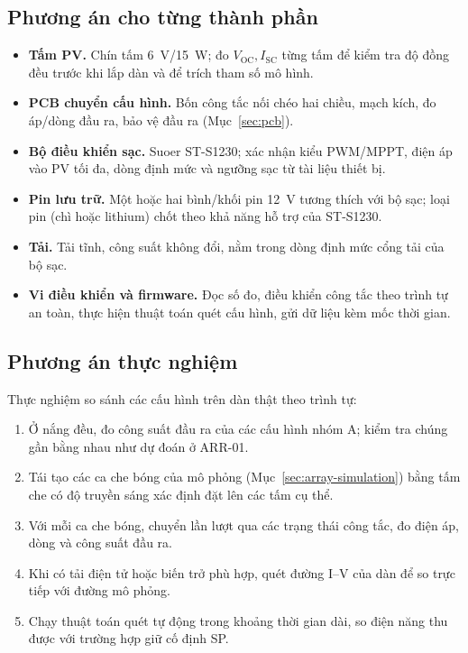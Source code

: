 \subsection{Phương án cho từng thành phần}

\begin{itemize}
    \item \textbf{Tấm PV.} Chín tấm 6~V/15~W; đo \(V_{\mathrm{OC}}, I_{\mathrm{SC}}\) từng tấm để kiểm tra độ đồng đều trước khi lắp dàn và để trích tham số mô hình.
    \item \textbf{PCB chuyển cấu hình.} Bốn công tắc nối chéo hai chiều, mạch kích, đo áp/dòng đầu ra, bảo vệ đầu ra (Mục~\ref{sec:pcb}).
    \item \textbf{Bộ điều khiển sạc.} Suoer ST-S1230; xác nhận kiểu PWM/MPPT, điện áp vào PV tối đa, dòng định mức và ngưỡng sạc từ tài liệu thiết bị.
    \item \textbf{Pin lưu trữ.} Một hoặc hai bình/khối pin 12~V tương thích với bộ sạc; loại pin (chì hoặc lithium) chốt theo khả năng hỗ trợ của ST-S1230.
    \item \textbf{Tải.} Tải tĩnh, công suất không đổi, nằm trong dòng định mức cổng tải của bộ sạc.
    \item \textbf{Vi điều khiển và firmware.} Đọc số đo, điều khiển công tắc theo trình tự an toàn, thực hiện thuật toán quét cấu hình, gửi dữ liệu kèm mốc thời gian.
\end{itemize}

\subsection{Phương án thực nghiệm}

Thực nghiệm so sánh các cấu hình trên dàn thật theo trình tự:

\begin{enumerate}
    \item Ở nắng đều, đo công suất đầu ra của các cấu hình nhóm A; kiểm tra chúng gần bằng nhau như dự đoán ở ARR-01.
    \item Tái tạo các ca che bóng của mô phỏng (Mục~\ref{sec:array-simulation}) bằng tấm che có độ truyền sáng xác định đặt lên các tấm cụ thể.
    \item Với mỗi ca che bóng, chuyển lần lượt qua các trạng thái công tắc, đo điện áp, dòng và công suất đầu ra.
    \item Khi có tải điện tử hoặc biến trở phù hợp, quét đường I--V của dàn để so trực tiếp với đường mô phỏng.
    \item Chạy thuật toán quét tự động trong khoảng thời gian dài, so điện năng thu được với trường hợp giữ cố định SP.
\end{enumerate}

